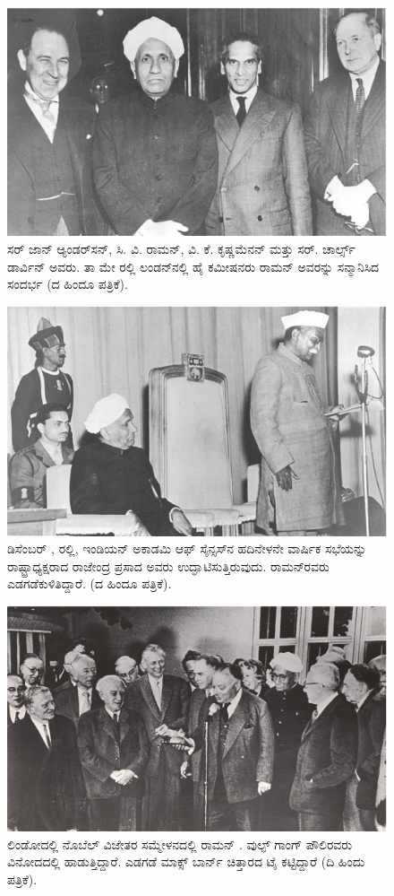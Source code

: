 \begin{figure}[!htpb]
\centering
\includegraphics[scale=0.23]{"images/5.jpg"}
\caption{ಸರ್ ಜಾನ್ ಆ್ಯಂಡರ್‌ಸನ್, ಸಿ. ವಿ. ರಾಮನ್, ವಿ. ಕೆ. ಕೃಷ್ಣಮೆನನ್ ಮತ್ತು ಸರ್. ಚಾರ್ಲ್ಸ್ ಡಾರ್ವಿನ್ ಅವರು. ತಾ  ಮೇ ರಲ್ಲಿ ಲಂಡನ್‍ನಲ್ಲಿ ಹೈ ಕಮೀಷನರು ರಾಮನ್ ಅವರನ್ನು ಸನ್ಮಾನಿಸಿದ ಸಂದರ್ಭ (ದ ಹಿಂದೂ ಪತ್ರಿಕೆ).}\label{chap3-fig03}
\end{figure}


\begin{figure}[!htpb]
\centering
\includegraphics[scale=0.23]{"images/6.jpg"}
\caption{ಡಿಸೆಂಬರ್ , ರಲ್ಲಿ, ಇಂಡಿಯನ್ ಅಕಾಡಮಿ ಆಫ್ ಸೈನ್ಸಸ್‍ನ ಹದಿನೇಳನೇ ವಾರ್ಷಿಕ ಸಭೆಯನ್ನು ರಾಷ್ಟ್ರಾಧ್ಯಕ್ಷರಾದ ರಾಜೇಂದ್ರ ಪ್ರಸಾದ ಅವರು ಉದ್ಘಾಟಿಸುತ್ತಿರುವುದು. ರಾಮನ್‍ರವರು ಎಡಗಡೆ\break ಕುಳಿತಿದ್ದಾರೆ. (ದ ಹಿಂದೂ ಪತ್ರಿಕೆ).}\label{chap3-fig04}
\end{figure}


\begin{figure}[!htpb]
\centering
\includegraphics[scale=0.23]{"images/8.jpg"}
\caption{ಲಿಂಡೋದಲ್ಲಿ ನೊಬೆಲ್ ವಿಜೇತರ ಸಮ್ಮೇಳನದಲ್ಲಿ ರಾಮನ್ . ವುಲ್ಫ್ ಗಾಂಗ್ ಪೌಲಿರವರು ವಿನೋದದಲ್ಲಿ ಹಾಡುತ್ತಿದ್ದಾರೆ. ಎಡಗಡೆ ಮಾಕ್ಸ್ ಬಾರ್ನ್ ಚಿತ್ತಾರದ ಟೈ ಕಟ್ಟಿದ್ದಾರೆ (ದಿ ಹಿಂದು ಪತ್ರಿಕೆ).}\label{chap3-fig05}
\end{figure}

